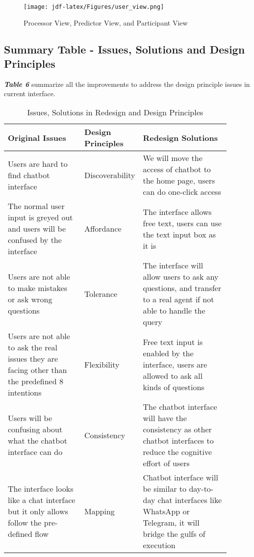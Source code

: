 \documentclass[
	letterpaper, %
]{jdf}
\begin{document}
\begin{figure}[hbt!]
	\centering
	\texttt{[image: jdf-latex/Figures/user\_view.png]}
	\caption{Processor View, Predictor View, and Participant View}
	\label{fig:wizard}
\end{figure}



\subsection{Summary Table - Issues, Solutions and Design Principles}
\textit{\textbf{Table 6}} summarize all the improvements to address the design principle issues in current interface.
\begin{table}[hbt!]
	\caption{Issues, Solutions in Redesign and Design Principles}
	\small %
	\centering %
	\begin{tabular}{L{0.35\linewidth} L{0.15\linewidth} L{0.4\linewidth}}
		\textbf{Original Issues} & \textbf{Design Principles} & \textbf{Redesign Solutions} \\
		\toprule[0.5pt]
		Users are hard to find chatbot interface & Discoverability & We will move the access of chatbot to the home page, users can do one-click access \\
		\midrule
		The normal user input is greyed out and users will be confused by the interface & Affordance & The interface allows free text, users can use the text input box as it is \\
		\midrule
		Users are not able to make mistakes or ask wrong questions & Tolerance & The interface will allow users to ask any questions, and transfer to a real agent if not able to handle the query \\
		\midrule
		Users are not able to ask the real issues they are facing other than the predefined 8 intentions & Flexibility & Free text input is enabled by the interface, users are allowed to ask all kinds of questions \\
		\midrule
		Users will be confusing about what the chatbot interface can do & Consistency & The chatbot interface will have the consistency as other chatbot interfaces to reduce the cognitive effort of users \\
		\midrule
		The interface looks like a chat interface but it only allows follow the pre-defined flow & Mapping & Chatbot interface will be similar to day-to-day chat interfaces like WhatsApp or Telegram, it will bridge the gulfs of execution \\
		\midrule

\end{tabular}
\end{table}
\end{document}
